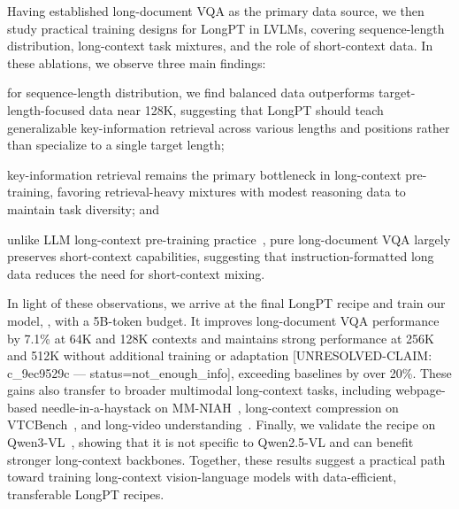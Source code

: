 Having established long-document VQA as the primary data source, we then study practical training designs for LongPT in LVLMs, covering sequence-length distribution, long-context task mixtures, and the role of short-context data.
In these ablations, we observe three main findings:
\begin{inparaenum}[i)]
\item for sequence-length distribution, we find balanced data outperforms target-length-focused data near 128K, suggesting that LongPT should teach generalizable key-information retrieval across various lengths and positions rather than specialize to a single target length;
\item key-information retrieval remains the primary bottleneck in long-context pre-training, favoring retrieval-heavy mixtures with modest reasoning data to maintain task diversity; and
\item unlike LLM long-context pre-training practice~\citep{gao2025prolong}, pure long-document VQA largely preserves short-context capabilities, suggesting that instruction-formatted long data reduces the need for short-context mixing.
\end{inparaenum}

In light of these observations, we arrive at the final LongPT recipe and train our model, \modelname, with a 5B-token budget.
It improves long-document VQA performance by 7.1\% at 64K and 128K contexts and maintains strong performance at 256K and 512K without additional training or adaptation [UNRESOLVED-CLAIM: c_9ec9529c — status=not_enough_info], exceeding baselines by over 20\%.
These gains also transfer to broader multimodal long-context tasks, including webpage-based needle-in-a-haystack on MM-NIAH~\citep{wang2024needle}, long-context compression on VTCBench~\citep{zhao2025vtcbench}, and long-video understanding~\citep{fu2025video,zhou2025mlvu,wu2024longvideobench}.
Finally, we validate the recipe on Qwen3-VL~\citep{bai2025qwen3}, showing that it is not specific to Qwen2.5-VL and can benefit stronger long-context backbones.
Together, these results suggest a practical path toward training long-context vision-language models with data-efficient, transferable LongPT recipes.